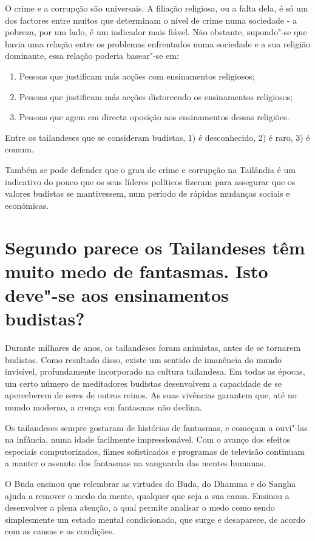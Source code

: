 O crime e a corrupção são universais. A filiação religiosa, ou a falta
dela, é só um dos factores entre muitos que determinam o nível de crime
numa sociedade - a pobreza, por um lado, é um indicador mais fiável. Não
obstante, supondo"-se que havia uma relação entre os problemas
enfrentados numa sociedade e a sua religião dominante, essa relação
poderia basear"-se em:

\begin{enumerate}
\item Pessoas que justificam más acções com ensinamentos religiosos;
\item Pessoas que justificam más acções distorcendo os ensinamentos religiosos;
\item Pessoas que agem em directa oposição aos ensinamentos dessas religiões.
\end{enumerate}

Entre os tailandeses que se consideram budistas, 1) é desconhecido, 2) é
raro, 3) é comum.

Também se pode defender que o grau de crime e corrupção na Tailândia é
um indicativo do pouco que os seus líderes políticos fizeram para
assegurar que os valores budistas se mantivessem, num período de rápidas
mudanças sociais e económicas.

\section{Segundo parece os Tailandeses têm muito medo de fantasmas. Isto deve"-se
  aos ensinamentos budistas?}

Durante milhares de anos, os tailandeses foram animistas, antes de se
tornarem budistas. Como resultado disso, existe um sentido de imanência
do mundo invisível, profundamente incorporado na cultura tailandesa. Em
todas as épocas, um certo número de meditadores budistas desenvolvem a
capacidade de se aperceberem de seres de outros reinos. As suas
vivências garantem que, até no mundo moderno, a crença em fantasmas não
declina.

Os tailandeses sempre gostaram de histórias de fantasmas, e começam a
ouvi"-las na infância, numa idade facilmente impressionável. Com o avanço
dos efeitos especiais computorizados, filmes sofisticados e programas de
televisão continuam a manter o assunto dos fantasmas na vanguarda das
mentes humanas.

O Buda ensinou que relembrar as virtudes do Buda, do Dhamma e do Sangha
ajuda a remover o medo da mente, qualquer que seja a sua causa. Ensinou
a desenvolver a plena atenção, a qual permite analisar o medo como sendo
simplesmente um estado mental condicionado, que surge e desaparece, de
acordo com as causas e as condições.

